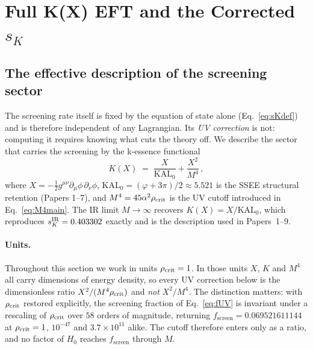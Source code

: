\documentclass[12pt,a4paper]{article}
\newcommand{\phiG}{\varphi}
\newcommand{\KAL}{\mathrm{KAL}_0}
\newcommand{\fsc}{f_{\mathrm{screen}}}
\newcommand{\sK}{s_K}
\newcommand{\rhoc}{\rho_{\rm crit}}
\begin{document}
\section{Full K(X) EFT and the Corrected $\sK$}
\label{sec:EFT}

\subsection{The effective description of the screening sector}

The screening rate itself is fixed by the equation of state alone
(Eq.~\eqref{eq:sKdef}) and is therefore independent of any Lagrangian. Its
\emph{UV correction} is not: computing it requires knowing what cuts the
theory off. We describe the sector that carries the screening by the
k-essence functional \citep{ArmendarizPicon2001}
\begin{equation}
  K(X) \;=\; \frac{X}{\KAL} + \frac{X^2}{M^4}\,,
  \label{eq:KX}
\end{equation}
where $X = -\tfrac{1}{2}g^{\mu\nu}\partial_\mu\phi\,\partial_\nu\phi$,
$\KAL = (\phiG+3\pi)/2 \approx 5.521$ is the SSEE structural retention
(Papers 1--7), and $M^4 = 45\alpha^2\rhoc$ is the UV cutoff introduced in
Eq.~\eqref{eq:M4main}.
The IR limit $M \to \infty$ recovers $K(X) = X/\KAL$, which reproduces
$\sK^{\rm IR} = 0.403302$ exactly and is the description used in
Papers~1--9.

\paragraph{Units.}
Throughout this section we work in units $\rhoc = 1$. In those units $X$,
$K$ and $M^4$ all carry dimensions of energy density, so every UV correction
below is the dimensionless ratio $X^2/(M^4\rhoc)$ and \emph{not} $X^2/M^4$.
The distinction matters: with $\rhoc$ restored explicitly, the screening
fraction of Eq.~\eqref{eq:fUV} is invariant under a rescaling of $\rhoc$ over
$58$ orders of magnitude, returning $\fsc = 0.069521611144$ at
$\rhoc = 1$, $10^{-47}$ and $3.7\times10^{11}$ alike. The cutoff therefore
enters only as a ratio, and no factor of $H_0$ reaches $\fsc$ through $M$.
\end{document}
